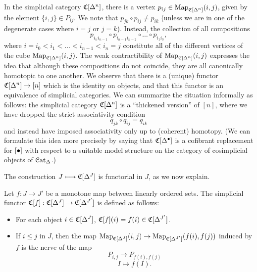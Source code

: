 \begin{1.1.5 inf-cats vs simplicial cats}
\begin{remark}
In the simplicial category $\operatorname{\mathfrak{C}}[\Delta^n]$, there is a vertex
$p_{ij} \in \operatorname{{Map}}_{ \operatorname{\mathfrak{C}}[\Delta^n] }(i,j)$, given by the element
$\{ i, j \} \in P_{ij}$. We note that $p_{jk} \circ p_{ij} \neq p_{ik}$ (unless we are in one of the degenerate cases where
$i =j$ or $j=k$). Instead, the collection of all compositions
$$ p_{i_n i_{n-1}} \circ p_{i_{n-1} i_{n-2}} \circ \ldots \circ p_{i_1 i_0},$$ where 
$i=i_0 < i_1 < \ldots <  i_{n-1} < i_n = j$ constitute all of the different vertices of the cube 
$\operatorname{{Map}}_{\operatorname{\mathfrak{C}}[\Delta^n]}(i,j)$. The weak contractibility of $\operatorname{{Map}}_{\operatorname{\mathfrak{C}}[\Delta^n]}(i,j)$
expresses the idea that although these compositions do not coincide, they are all canonically homotopic to one another. We observe that there is a (unique) functor
$\operatorname{\mathfrak{C}}[\Delta^n] \rightarrow [n]$ which is the identity on objects, and that this functor
is an equivalence of simplicial categories. We can summarize the situation informally as follows: the simplicial category $\operatorname{\mathfrak{C}}[\Delta^n]$ is a ``thickened version'' of $[n]$, where
we have dropped the strict associativity condition
$$ q_{jk} \circ q_{ij} = q_{ik}$$ and instead have imposed associativity only up to (coherent) homotopy. (We can formulate this idea more precisely by saying that $\operatorname{\mathfrak{C}}[ \Delta^{\bullet}]$ is a cofibrant replacement for $[\bullet]$ with respect to a suitable model structure on the category of cosimplicial objects of $\operatorname{\mathcal{C}at_{\Delta}}$.)
\end{remark}

The construction $J \longmapsto \operatorname{\mathfrak{C}}[\Delta^J]$ is functorial in $J$, as we now explain.

\begin{definition}\label{csimp2}
Let $f: J \rightarrow J'$ be a monotone map between linearly
ordered sets. The simplicial functor $\operatorname{\mathfrak{C}}[f]:
\operatorname{\mathfrak{C}}[\Delta^J] \rightarrow \operatorname{\mathfrak{C}}[\Delta^{J'}]$ is defined
as follows:

\begin{itemize}
\item For each object $i \in \operatorname{\mathfrak{C}}[\Delta^J]$,
$\operatorname{\mathfrak{C}}[f](i) = f(i) \in \operatorname{\mathfrak{C}}[\Delta^{J'}]$.

\item If $i \leq j$ in $J$, then the map
$ \operatorname{{Map}}_{\operatorname{\mathfrak{C}}[\Delta^J]}(i,j) \rightarrow
\operatorname{{Map}}_{\operatorname{\mathfrak{C}}[\Delta^{J'}]}(f(i),f(j))$ induced by $f$ is the nerve of the map $$P_{i,j}
\rightarrow P_{f(i),f(j)}$$
$$ I \mapsto f(I).$$
\end{itemize}
\end{definition}


\end{1.1.5 inf-cats vs simplicial cats}

